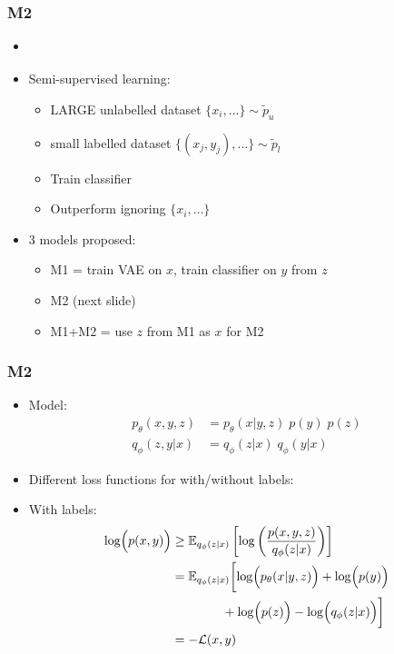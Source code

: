 \documentclass[xcolor=table,dvipsnames]{beamer}
\begin{document}
\begin{frame}
    \frametitle{M2}
    \begin{itemize}
        \setlength{\itemsep}{1em}
        \item \cite{kingma2014semi}
        \item Semi-supervised learning:
        \begin{itemize}
            \item LARGE unlabelled dataset $\{x_i, \dots\}\sim\tilde{p}_u$
            \item small labelled dataset $\{(x_j, y_j), \dots\}\sim\tilde{p}_l$
            \item Train classifier
            \item Outperform ignoring $\{x_i, \dots\}$
        \end{itemize}
        \item 3 models proposed:
        \begin{itemize}
            \item M1 = train VAE on $x$, train classifier on $y$ from $z$
            \item M2 (next slide)
            \item M1+M2 = use $z$ from M1 as $x$ for M2
        \end{itemize}
    \end{itemize}
\end{frame}

\begin{frame}
    \frametitle{M2}
    \begin{itemize}
        \item Model:
        \begin{align*}
            p_\theta(x, y, z) &= p_\theta(x\vert y, z)\;p(y)\;p(z) \tag{Generative model} \\
            q_\phi (z, y\vert x) &= q_\phi (z\vert x) \; q_\phi (y\vert x) \tag{Factorised posterior}
        \end{align*}
        \item Different loss functions for with/without labels:
        \item With labels:
        \begin{align*}
            \log\Bigl( p(x, y) \Bigr) &\ge \mathbb{E}_{q_\phi(z\vert x)}\left[ \log\left(\frac{p(x, y, z)}{q_\phi(z\vert x)}\right) \right] \\
            &= \mathbb{E}_{q_\phi(z\vert x)}\biggl[ \log\Bigl( p_\theta(x \vert y, z) \Bigr) + \log\Bigl( p(y) \Bigr) \\
            &\qquad\qquad + \log\Bigl( p(z) \Bigr) - \log\Bigl( q_\phi(z\vert x) \Bigr) \biggr] \\
            &= -\mathcal{L}(x, y)
        \end{align*}
    \end{itemize}
\end{frame}
\end{document}
